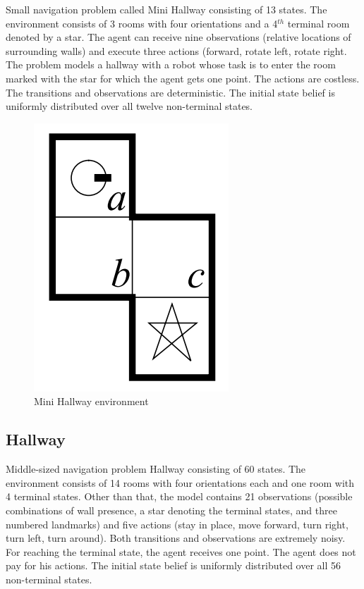Small navigation problem called Mini Hallway \cite{Littman} consisting of 13 states. The environment consists of 3 rooms with four orientations and a 4$^{th}$ terminal room denoted by a star. The agent can receive nine observations (relative locations of surrounding walls) and execute three actions (forward, rotate left, rotate right.
The problem models a hallway with a robot whose task is to enter the room marked with the star for which the agent gets one point. The actions are costless. The transitions and observations are deterministic. The initial state belief is uniformly distributed over all twelve non-terminal states.
\begin{figure}[ht]
\caption{Mini Hallway environment}
\centering
\includegraphics[scale=0.5]{pictures/MiniHallway.png}
\end{figure}

\subsection{Hallway}

Middle-sized navigation problem Hallway \cite{Littman} consisting of 60 states. The environment consists of 14 rooms with four orientations each and one room with 4 terminal states. Other than that, the model contains 21 observations (possible combinations of wall presence, a star denoting the terminal states, and three numbered landmarks) and five actions (stay in place, move forward, turn right, turn left, turn around). Both transitions and observations are extremely noisy. For reaching the terminal state, the agent receives one point. The agent does not pay for his actions. The initial state belief is uniformly distributed over all 56 non-terminal states.

